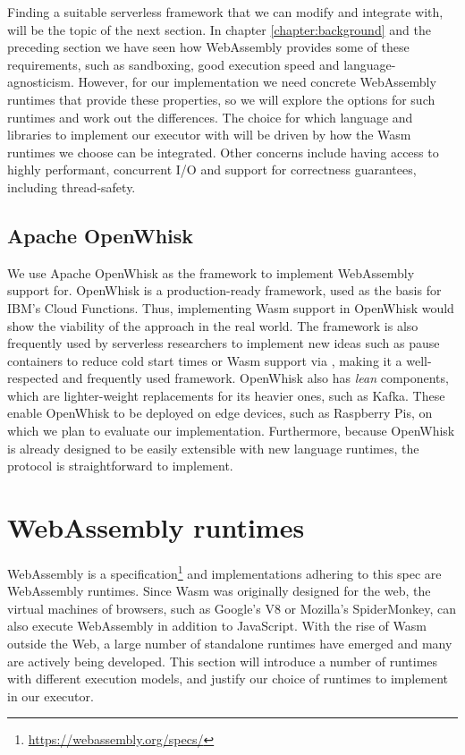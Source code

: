 Finding a suitable serverless framework that we can modify and integrate with, will be the topic of the next section. In chapter \ref{chapter:background} and the preceding section we have seen how WebAssembly provides some of these requirements, such as sandboxing, good execution speed and language-agnosticism. However, for our implementation we need concrete WebAssembly runtimes that provide these properties, so we will explore the options for such runtimes and work out the differences. The choice for which language and libraries to implement our executor with will be driven by how the Wasm runtimes we choose can be integrated. Other concerns include having access to highly performant, concurrent I/O and support for correctness guarantees, including thread-safety.

\subsection{Apache OpenWhisk}

We use Apache OpenWhisk as the framework to implement WebAssembly support for. OpenWhisk is a production-ready framework, used as the basis for IBM's Cloud Functions. Thus, implementing Wasm support in OpenWhisk would show the viability of the approach in the real world. The framework is also frequently used by serverless researchers to implement new ideas such as pause containers to reduce cold start times \cite{Mohan2019} or Wasm support via  \cite{Hall2019}, making it a well-respected and frequently used framework. OpenWhisk also has \emph{lean} components, which are lighter-weight replacements for its heavier ones, such as Kafka. These enable OpenWhisk to be deployed on edge devices, such as Raspberry Pis, on which we plan to evaluate our implementation. Furthermore, because OpenWhisk is already designed to be easily extensible with new language runtimes, the protocol is straightforward to implement.

\section{WebAssembly runtimes}
\label{section:wasm-runtimes}

WebAssembly is a specification\footnote{\url{https://webassembly.org/specs/}} and implementations adhering to this spec are WebAssembly runtimes. Since Wasm was originally designed for the web, the virtual machines of browsers, such as Google's V8 or Mozilla's SpiderMonkey, can also execute WebAssembly in addition to JavaScript. With the rise of Wasm outside the Web, a large number of standalone runtimes have emerged and many are actively being developed. This section will introduce a number of runtimes with different execution models, and justify our choice of runtimes to implement in our executor.


